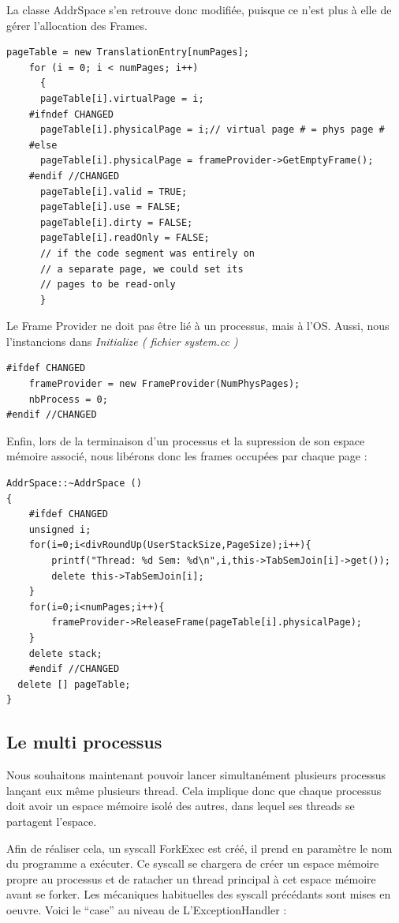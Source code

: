 \documentclass[a4paper,10pt]{article}
\begin{document}
\newpage
La classe AddrSpace s'en retrouve donc modifiée, puisque ce n'est plus à elle de gérer l'allocation des Frames.
\begin{lstlisting}[frame=single]
 pageTable = new TranslationEntry[numPages];
    for (i = 0; i < numPages; i++)
      {
	  pageTable[i].virtualPage = i;	
	#ifndef CHANGED
	  pageTable[i].physicalPage = i;// virtual page # = phys page #
	#else
	  pageTable[i].physicalPage = frameProvider->GetEmptyFrame();
	#endif //CHANGED
	  pageTable[i].valid = TRUE;
	  pageTable[i].use = FALSE;
	  pageTable[i].dirty = FALSE;
	  pageTable[i].readOnly = FALSE;
	  // if the code segment was entirely on 
	  // a separate page, we could set its 
	  // pages to be read-only
      }
\end{lstlisting}

Le Frame Provider ne doit pas être lié à un processus, mais à l'OS. Aussi, nous l'instancions dans \textit{Initialize  ( fichier system.cc )}

\begin{lstlisting}[frame=single]
 #ifdef CHANGED
    frameProvider = new FrameProvider(NumPhysPages);
    nbProcess = 0;
#endif //CHANGED
\end{lstlisting}

Enfin, lors de la terminaison d'un processus et la supression de son espace mémoire associé, nous libérons donc les frames occupées par chaque page :

\begin{lstlisting}[frame=single]
 AddrSpace::~AddrSpace ()
{
	#ifdef CHANGED
	unsigned i;
	for(i=0;i<divRoundUp(UserStackSize,PageSize);i++){
		printf("Thread: %d Sem: %d\n",i,this->TabSemJoin[i]->get());
		delete this->TabSemJoin[i];
	}
	for(i=0;i<numPages;i++){
		frameProvider->ReleaseFrame(pageTable[i].physicalPage);
	}
	delete stack;
	#endif //CHANGED
  delete [] pageTable;
}
\end{lstlisting}
\newpage
\subsection{Le multi processus}
Nous souhaitons maintenant pouvoir lancer simultanément plusieurs processus lançant eux même plusieurs thread.
Cela implique donc que chaque processus doit avoir un espace mémoire isolé des autres, dans lequel ses threads se partagent l'espace.

Afin de réaliser cela, un syscall ForkExec est créé, il prend en paramètre le nom du programme a exécuter. Ce syscall se chargera de créer un espace mémoire propre au processus
et de ratacher un thread principal à cet espace mémoire avant se forker. Les mécaniques habituelles des syscall précédants sont mises en oeuvre. Voici le ``case''  au niveau de L'ExceptionHandler :
\end{document}
